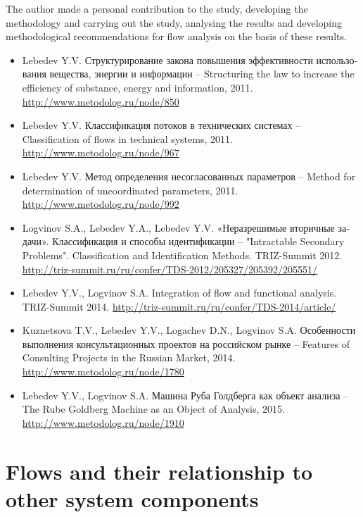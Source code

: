 \documentclass[a4paper,11pt]{article}
\begin{document}
The author made a personal contribution to the study, developing the
methodology and carrying out the study, analysing the results and developing
methodological recommendations for flow analysis on the basis of these
results.
\begin{itemize}
\item Lebedev Y.V. \foreignlanguage{russian}{Структурирование закона повышения
  эффективности использования вещества, энергии и информации} -- Structuring
  the law to increase the efficiency of substance, energy and information,
  2011.  \url{http://www.metodolog.ru/node/850}
\item Lebedev Y.V. \foreignlanguage{russian}{Классификация потоков в
  технических системах} -- Classification of flows in technical systems, 2011.
  \url{http://www.metodolog.ru/node/967}
\item Lebedev Y.V. \foreignlanguage{russian}{Метод определения несогласованных
  параметров} -- Method for determination of uncoordinated parameters, 2011.
  \url{http://www.metodolog.ru/node/992}
\item Logvinov S.A., Lebedev Y.A., Lebedev
  Y.V. \foreignlanguage{russian}{«Неразрешимые вторичные задачи».
    Классификация и способы идентификации} -- "Intractable Secondary
  Problems".  Classification and Identification Methods. TRIZ-Summit 2012.\\ 
  \url{http://triz-summit.ru/ru/confer/TDS-2012/205327/205392/205551/}
\item Lebedev Y.V., Logvinov S.A. Integration of flow and functional analysis.
  TRIZ-Summit 2014.  \url{http://triz-summit.ru/ru/confer/TDS-2014/article/}
\item Kuznetsova T.V., Lebedev Y.V., Logachev D.N., Logvinov S.A.
  \foreignlanguage{russian}{Особенности выполнения консультационных проектов
    на российском рынке} -- Features of Consulting Projects in the Russian
  Market, 2014.  \url{http://www.metodolog.ru/node/1780}
\item Lebedev Y.V., Logvinov S.A. \foreignlanguage{russian}{Машина Руба
  Голдберга как объект анализа} -- The Rube Goldberg Machine as an Object of
  Analysis, 2015.\\  \url{http://www.metodolog.ru/node/1910}
\end{itemize}

\section{Flows and their relationship to other system components}
\end{document}

